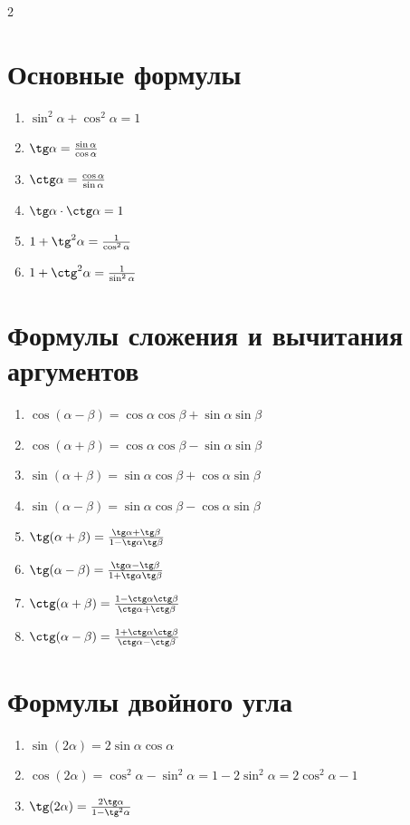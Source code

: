 \documentclass[]{article}
\begin{document}
	\thispagestyle{fancy}
	\begin{multicols}{2}
		
		\section*{Основные формулы}
		\begin{enumerate}
			\item $\sin^2\alpha + \cos^2\alpha = 1$
			\item $\tg\alpha = \frac{\sin\alpha}{\cos\alpha}$
			\item $\ctg\alpha = \frac{\cos\alpha}{\sin\alpha}$
			\item $\tg\alpha \cdot \ctg\alpha = 1$
			\item $1 + \tg^2\alpha = \frac{1}{\cos^2\alpha}$
			\item $1 + \ctg^2\alpha = \frac{1}{\sin^2\alpha}$
		\end{enumerate}
		
		\section*{Формулы сложения и вычитания аргументов}
		\begin{enumerate}
			\item $\cos(\alpha - \beta) = \cos\alpha \cos\beta + \sin\alpha \sin\beta$
			\item $\cos(\alpha + \beta) = \cos\alpha \cos\beta - \sin\alpha \sin\beta$
			\item $\sin(\alpha + \beta) = \sin\alpha \cos\beta + \cos\alpha \sin\beta$
			\item $\sin(\alpha - \beta) = \sin\alpha \cos\beta - \cos\alpha \sin\beta$
			\item $\tg(\alpha + \beta) = \frac{\tg\alpha + \tg\beta}{1 - \tg\alpha \tg\beta}$
			\item $\tg(\alpha - \beta) = \frac{\tg\alpha - \tg\beta}{1 + \tg\alpha \tg\beta}$
			\item $\ctg(\alpha + \beta) = \frac{1 - \ctg\alpha \ctg\beta}{\ctg\alpha + \ctg\beta}$
			\item $\ctg(\alpha - \beta) = \frac{1 + \ctg\alpha \ctg\beta}{\ctg\alpha - \ctg\beta}$
		\end{enumerate}
		
		\section*{Формулы двойного угла}
		\begin{enumerate}
			\item $\sin(2\alpha) = 2\sin\alpha\cos\alpha$
			\item $\cos(2\alpha) = \cos^2\alpha - \sin^2\alpha = 1 - 2\sin^2\alpha = 2\cos^2\alpha - 1$
			\item $\tg(2\alpha) = \frac{2\tg\alpha}{1 - \tg^2\alpha}$
		\end{enumerate}
		

\end{multicols}
\end{document}

